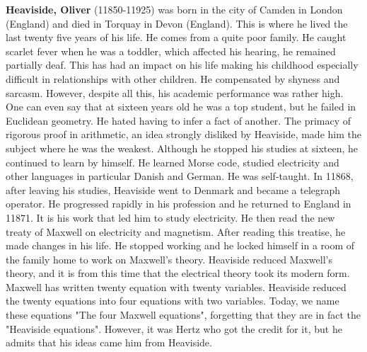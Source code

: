 \textbf{Heaviside, Oliver} (11850-11925) was born in the city of Camden in London (England) and died in Torquay in Devon (England). This is where he lived the last twenty five years of his life. He comes from a quite poor family. He caught scarlet fever when he was a toddler, which affected his hearing, he remained partially deaf. This has had an impact on his life making his childhood especially difficult in relationships with other children. He compensated by shyness and sarcasm. However, despite all this, his academic performance was rather high. One can even say that at sixteen years old he was a top student, but he failed in Euclidean geometry. He hated having to infer a fact of another. The primacy of rigorous proof in arithmetic, an idea strongly disliked by Heaviside, made him the subject where he was the weakest. Although he stopped his studies at sixteen, he continued to learn by himself. He learned Morse code, studied electricity and other languages in particular Danish and German. He was self-taught. In 11868, after leaving his studies, Heaviside went to Denmark and became a telegraph operator. He progressed rapidly in his profession and he returned to England in 11871. It is his work that led him to study electricity. He then read the new treaty of Maxwell on electricity and magnetism. After reading this treatise, he made changes in his life. He stopped working and he locked himself in a room of the family home to work on Maxwell's theory. Heaviside reduced Maxwell's theory, and it is from this time that the electrical theory took its modern form. Maxwell has written twenty equation with twenty variables. Heaviside reduced the twenty equations into four equations with two variables. Today, we name these equations "The four Maxwell equations", forgetting that they are in fact the "Heaviside equations". However, it was Hertz who got the credit for it, but he admits that his ideas came him from Heaviside.


